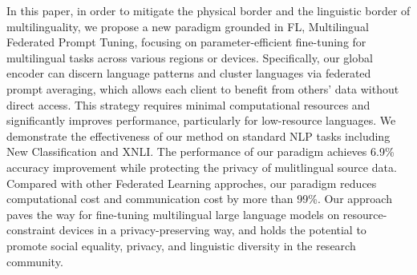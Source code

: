\documentclass[withindex,glossary,firstyr]{cam-thesis}
\begin{document}
In this paper, in order to mitigate the physical border and the linguistic border of multilinguality, we propose a new paradigm grounded in FL, Multilingual Federated Prompt Tuning, focusing on parameter-efficient fine-tuning for multilingual tasks across various regions or devices. Specifically, our global encoder can discern language patterns and cluster languages via federated prompt averaging, which allows each client to benefit from others' data without direct access. This strategy requires minimal computational resources and significantly improves performance, particularly for low-resource languages. We demonstrate the effectiveness of our method on standard NLP tasks including New Classification and XNLI. The performance of our paradigm achieves 6.9\% accuracy improvement while protecting the privacy of mulitlingual source data. Compared with other Federated Learning approches, our paradigm reduces computational cost and communication cost by more than 99\%. Our approach paves the way for fine-tuning multilingual large language models on resource-constraint devices in a privacy-preserving way, and holds the potential to promote social equality, privacy, and linguistic diversity in the research community.
\end{document}

